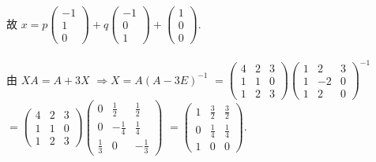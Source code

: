 		 故 $x = p\begin{pmatrix}
				 -1 \\
				 1  \\
				 0
			 \end{pmatrix} + q\begin{pmatrix}
				 -1 \\
				 0  \\
				 1
			 \end{pmatrix} + \begin{pmatrix}
				 1 \\
				 0 \\
				 0
			 \end{pmatrix}$.


	 \paragraph{} %
		 由 $XA = A + 3X$ $\Rightarrow X = A(A-3E)^{-1}$
		 $= \begin{pmatrix}
				 4 & 2 & 3 \\
				 1 & 1 & 0 \\
				 1 & 2 & 3
			 \end{pmatrix}
			 \begin{pmatrix}
				 1 & 2  & 3 \\
				 1 & -2 & 0 \\
				 1 & 2  & 0
			 \end{pmatrix}^{-1}$
		 $= \begin{pmatrix}
				 4 & 2 & 3 \\
				 1 & 1 & 0 \\
				 1 & 2 & 3
			 \end{pmatrix}
			 \begin{pmatrix}
				 0           & \frac{1}{2}  & \frac{1}{2}  \\
				 0           & -\frac{1}{4} & \frac{1}{4}  \\
				 \frac{1}{3} & 0            & -\frac{1}{3}
			 \end{pmatrix}$
		 $= \begin{pmatrix}
				 1 & \frac{3}{2} & \frac{3}{2} \\
				 0 & \frac{1}{4} & \frac{1}{4} \\
				 1 & 0           & 0
			 \end{pmatrix}$.


